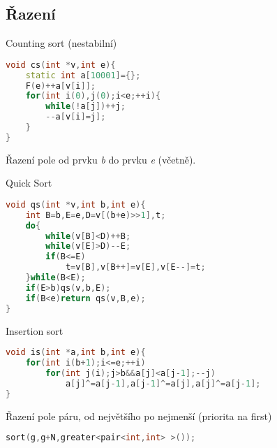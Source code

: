 \documentclass[11pt]{article}
\begin{document}
\subsection{Řazení}
\begin{center}
Counting sort (nestabilní)
\end{center}
\begin{lstlisting}[language=C++]
void cs(int *v,int e){
    static int a[10001]={};
    F(e)++a[v[i]];
    for(int i(0),j(0);i<e;++i){
        while(!a[j])++j;
        --a[v[i]=j];
    }
}
\end{lstlisting}
Řazení pole od prvku \textsl{b} do prvku \textsl{e} (včetně).
\begin{center}
Quick Sort
\end{center}
\begin{lstlisting}[language=C++]
void qs(int *v,int b,int e){
    int B=b,E=e,D=v[(b+e)>>1],t;
    do{
        while(v[B]<D)++B;
        while(v[E]>D)--E;
        if(B<=E)
            t=v[B],v[B++]=v[E],v[E--]=t;
    }while(B<E);
    if(E>b)qs(v,b,E);
    if(B<e)return qs(v,B,e);
}
\end{lstlisting}
\begin{center}
Insertion sort
\end{center}
\begin{lstlisting}[language=C++]
void is(int *a,int b,int e){
    for(int i(b+1);i<=e;++i)
        for(int j(i);j>b&&a[j]<a[j-1];--j)
            a[j]^=a[j-1],a[j-1]^=a[j],a[j]^=a[j-1];
}
\end{lstlisting}
\begin{center}
Řazení pole páru, od největšího po nejmenší (priorita na first)
\end{center}
\begin{lstlisting}[language=C++]
sort(g,g+N,greater<pair<int,int> >());
\end{lstlisting}
\end{document}
